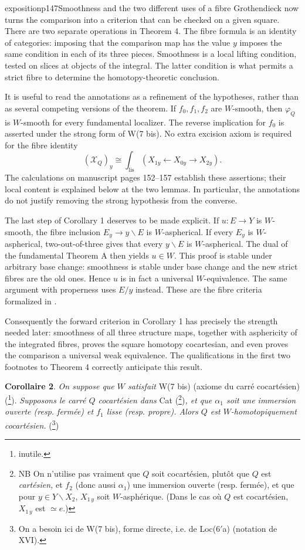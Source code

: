 \begin{dcomment}{exposition}{p147}{Smoothness and the two different uses of a fibre}
Grothendieck now turns the comparison into a criterion that can be checked on a given square. There are two separate operations in Theorem 4. The fibre formula is an identity of categories: imposing that the comparison map has the value $y$ imposes the same condition in each of its three pieces. Smoothness is a local lifting condition, tested on slices at objects of the integral. The latter condition is what permits a strict fibre to determine the homotopy-theoretic conclusion.

It is useful to read the annotations as a refinement of the hypotheses, rather than as several competing versions of the theorem. If $f_0,f_1,f_2$ are $W$-smooth, then $\varphi_Q$ is $W$-smooth for every fundamental localizer. The reverse implication for $f_0$ is asserted under the strong form of W(7 bis). No extra excision axiom is required for the fibre identity
\[
 (\mathcal X_Q)_y\cong
 \int_{\mathrm{lis}}(X_{1y}\leftarrow X_{0y}\to X_{2y}).
\]
The calculations on manuscript pages 152--157 establish these assertions; their local content is explained below at the two lemmas. In particular, the annotations do not justify removing the strong hypothesis from the converse.

The last step of Corollary 1 deserves to be made explicit. If $u:E\to Y$ is $W$-smooth, the fibre inclusion $E_y\to y\backslash E$ is $W$-aspherical. If every $E_y$ is $W$-aspherical, two-out-of-three gives that every $y\backslash E$ is $W$-aspherical. The dual of the fundamental Theorem A then yields $u\in W$. This proof is stable under arbitrary base change: smoothness is stable under base change and the new strict fibres are the old ones. Hence $u$ is in fact a universal $W$-equivalence. The same argument with properness uses $E/y$ instead. These are the fibre criteria formalized in \citet[Theorem~1.2]{Maltsiniotis2005Asphericite}.

Consequently the forward criterion in Corollary 1 has precisely the strength needed later: smoothness of all three structure maps, together with asphericity of the integrated fibres, proves the square homotopy cocartesian, and even proves the comparison a universal weak equivalence. The qualifications in the first two footnotes to Theorem 4 correctly anticipate this result.
\end{dcomment}


\textbf{Corollaire 2}. \textit{On suppose que $W$ satisfait} W(7 bis) (axiome du carré cocartésien) (\footnote{inutile.}).
\textit{Supposons le carré $Q$ cocartésien dans} Cat (\footnote{NB On n'utilise pas vraiment que $Q$ soit cocartésien, plutôt que $Q$ est \textit{cartésien,} et $f_2$ (donc aussi $\alpha_1$) une immersion ouverte (resp. fermée), et que pour $y \in Y\backslash X_2$, $X_{1\,y}$ soit $W$-asphérique. (Dans le cas où $Q$ est cocartésien, $X_{1\,y}$ est $\simeq e$.)})\textit{, et que $\alpha_1$ soit une immersion ouverte (resp. fermée) et $f_1$ lisse (resp. propre). Alors $Q$ est $W$-homotopiquement cocartésien.} (\footnote{On a besoin ici de W(7 bis), forme directe, i.e. de Loc(6$'$a) (notation de XVI).})

